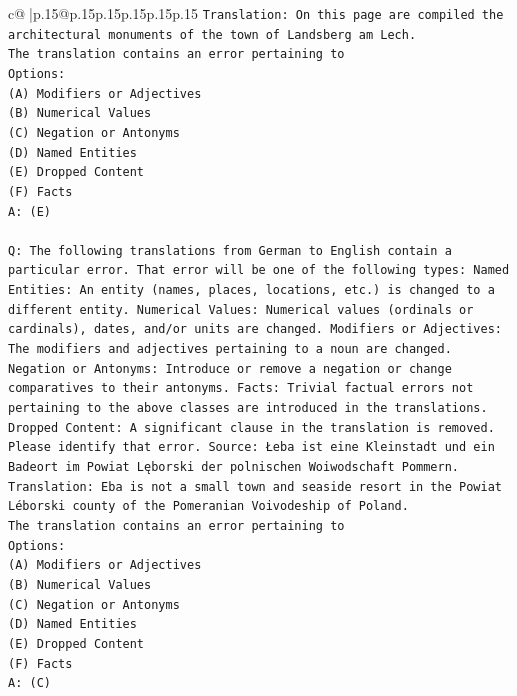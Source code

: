 \documentclass{article}
\begin{document}
{\begin{supertabular}{c@{$\;$}|p{.15\linewidth}@{}p{.15\linewidth}p{.15\linewidth}p{.15\linewidth}p{.15\linewidth}p{.15\linewidth}}
{{{\texttt{Translation: On this page are compiled the architectural monuments of the town of Landsberg am Lech.} \\
\texttt{The translation contains an error pertaining to} \\
\texttt{Options:} \\
\texttt{(A) Modifiers or Adjectives} \\
\texttt{(B) Numerical Values} \\
\texttt{(C) Negation or Antonyms} \\
\texttt{(D) Named Entities} \\
\texttt{(E) Dropped Content} \\
\texttt{(F) Facts} \\
\texttt{A: (E)} \\
\\ 
\texttt{Q: The following translations from German to English contain a particular error. That error will be one of the following types: Named Entities: An entity (names, places, locations, etc.) is changed to a different entity. Numerical Values: Numerical values (ordinals or cardinals), dates, and/or units are changed. Modifiers or Adjectives: The modifiers and adjectives pertaining to a noun are changed. Negation or Antonyms: Introduce or remove a negation or change comparatives to their antonyms. Facts: Trivial factual errors not pertaining to the above classes are introduced in the translations. Dropped Content: A significant clause in the translation is removed. Please identify that error.  Source: Łeba ist eine Kleinstadt und ein Badeort im Powiat Lęborski der polnischen Woiwodschaft Pommern.} \\
\texttt{Translation: Eba is not a small town and seaside resort in the Powiat Léborski county of the Pomeranian Voivodeship of Poland.} \\
\texttt{The translation contains an error pertaining to} \\
\texttt{Options:} \\
\texttt{(A) Modifiers or Adjectives} \\
\texttt{(B) Numerical Values} \\
\texttt{(C) Negation or Antonyms} \\
\texttt{(D) Named Entities} \\
\texttt{(E) Dropped Content} \\
\texttt{(F) Facts} \\
\texttt{A: (C)} \\
\\ 
}}}
\end{supertabular}}
\end{document}
